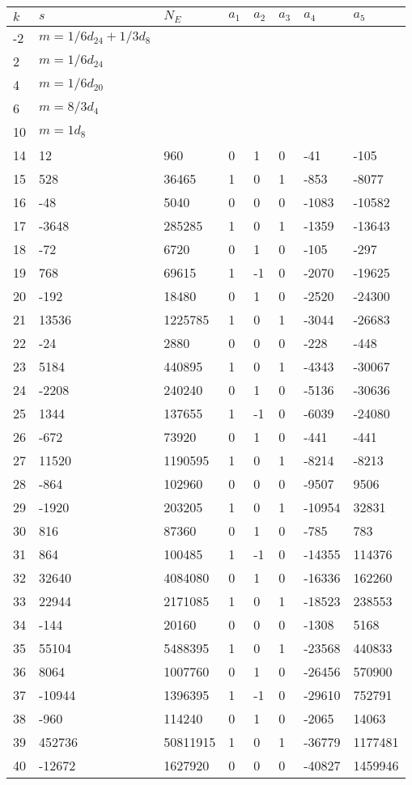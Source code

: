 \documentclass{amsart}
\begin{document}
\begin{longtable}{|l|l|l|lllll|}
\hline
$k$ & $s$ & $N_E$ & $a_1$ & $a_2$ & $a_3$ & $a_4$ & $a_5$\\
\hline
-2&$m=1/6d_{24}+1/3d_{8}$&&\multicolumn{5}{c|}{}\\
2&$m=1/6d_{24}$&&\multicolumn{5}{c|}{}\\
4&$m=1/6d_{20}$&&\multicolumn{5}{c|}{}\\
6&$m=8/3d_{4}$&&\multicolumn{5}{c|}{}\\
10&$m=1d_{8}$&&\multicolumn{5}{c|}{}\\
14&12&960&0&1&0&-41&-105\\
15&528&36465&1&0&1&-853&-8077\\
16&-48&5040&0&0&0&-1083&-10582\\
17&-3648&285285&1&0&1&-1359&-13643\\
18&-72&6720&0&1&0&-105&-297\\
19&768&69615&1&-1&0&-2070&-19625\\
20&-192&18480&0&1&0&-2520&-24300\\
21&13536&1225785&1&0&1&-3044&-26683\\
22&-24&2880&0&0&0&-228&-448\\
23&5184&440895&1&0&1&-4343&-30067\\
24&-2208&240240&0&1&0&-5136&-30636\\
25&1344&137655&1&-1&0&-6039&-24080\\
26&-672&73920&0&1&0&-441&-441\\
27&11520&1190595&1&0&1&-8214&-8213\\
28&-864&102960&0&0&0&-9507&9506\\
29&-1920&203205&1&0&1&-10954&32831\\
30&816&87360&0&1&0&-785&783\\
31&864&100485&1&-1&0&-14355&114376\\
32&32640&4084080&0&1&0&-16336&162260\\
33&22944&2171085&1&0&1&-18523&238553\\
34&-144&20160&0&0&0&-1308&5168\\
35&55104&5488395&1&0&1&-23568&440833\\
36&8064&1007760&0&1&0&-26456&570900\\
37&-10944&1396395&1&-1&0&-29610&752791\\
38&-960&114240&0&1&0&-2065&14063\\
39&452736&50811915&1&0&1&-36779&1177481\\
40&-12672&1627920&0&0&0&-40827&1459946\\

\end{longtable}
\end{document}
